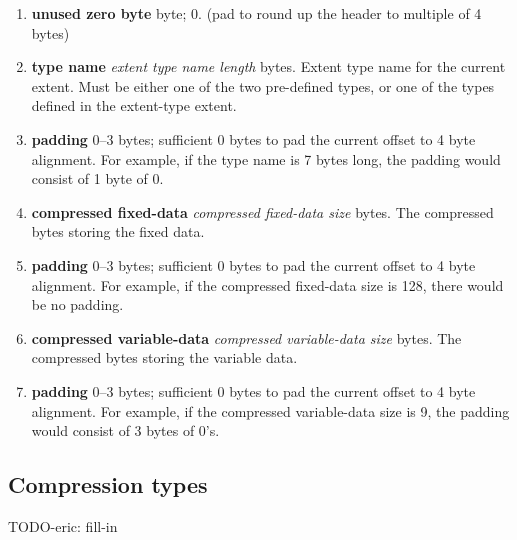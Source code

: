 \begin{enumerate}
  \item {\bf unused zero byte} byte; 0.  (pad to round up the header to multiple of 4 bytes)

  \item {\bf type name} {\it extent type name length} bytes.  Extent
    type name for the current extent.  Must be either one of the two
    pre-defined types, or one of the types defined in the extent-type
    extent.

  \item {\bf padding} 0--3 bytes; sufficient 0 bytes to pad the
    current offset to 4 byte alignment.  For example, if the type name
    is 7 bytes long, the padding would consist of 1 byte of 0.

  \item {\bf compressed fixed-data} {\it compressed fixed-data size}
    bytes.  The compressed bytes storing the fixed data.

  \item {\bf padding} 0--3 bytes; sufficient 0 bytes to pad the
    current offset to 4 byte alignment.  For example, if the
    compressed fixed-data size is 128, there would be no padding.

  \item {\bf compressed variable-data} {\it compressed variable-data size}
    bytes.  The compressed bytes storing the variable data.

  \item {\bf padding} 0--3 bytes; sufficient 0 bytes to pad the
    current offset to 4 byte alignment.  For example, if the
    compressed variable-data size is 9, the padding would consist of 3
    bytes of 0's.
\end{enumerate}

\subsection{Compression types}
\label{sec:ff:compression-types}

TODO-eric: fill-in


